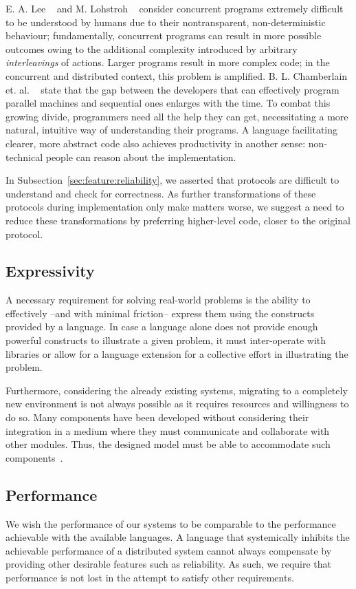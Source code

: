 E. A. Lee ~\cite{langNec} and M. Lohstroh ~\cite{criticalPathReo} consider concurrent programs extremely difficult to be understood by humans due to their nontransparent, non-deterministic behaviour; fundamentally, concurrent programs can result in more possible outcomes owing to the additional complexity introduced by arbitrary \textit{interleavings} of actions. Larger programs result in more complex code; in the concurrent and distributed context, this problem is amplified.
B. L. Chamberlain et. al. ~\cite{chapel} state that the gap between the developers that can effectively program parallel machines and sequential ones enlarges with the time.
To combat this growing divide, programmers need all the help they can get, necessitating a more natural, intuitive way of understanding their programs. A language facilitating clearer, more abstract code also achieves productivity in another sense: non-technical people can reason about the implementation.

In Subsection~\ref{sec:feature:reliability}, we asserted that protocols are difficult to understand and check for correctness. As further transformations of these protocols during implementation only make matters worse, we suggest a need to reduce these transformations by preferring higher-level code, closer to the original protocol.

\subsection{Expressivity}
\label{sec:feature:expressivity}
A necessary requirement for solving real-world problems is the ability to effectively --and with minimal friction-- express them using the constructs provided by a language. 
In case a language alone does not provide enough powerful constructs to illustrate a given problem, it must inter-operate with libraries or allow for a language extension for a collective effort in illustrating the problem.

Furthermore, considering the already existing systems, migrating to a completely new environment is not always possible as it requires resources and willingness to do so. Many components have been developed without considering their integration in a medium where they must communicate and collaborate with other modules. Thus, the designed model must be able to accommodate such components~\cite{manifold}.

\subsection{Performance}
\label{sec:feature:performance}
We wish the performance of our systems to be comparable to the performance achievable with the available languages. A language that systemically inhibits the achievable performance of a distributed system cannot always compensate by providing other desirable features such as reliability.
As such, we require that performance is not lost in the attempt to satisfy other requirements.

